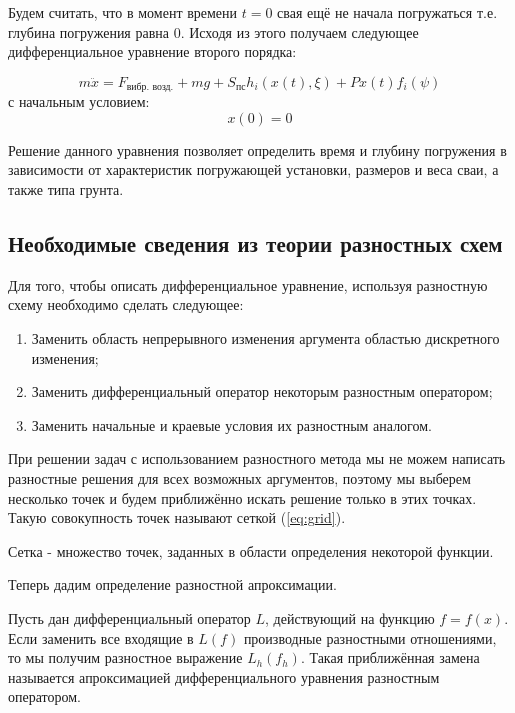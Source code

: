 \noindent Будем считать, что в момент времени $t = 0$ свая ещё не начала погружаться т.е. глубина погружения равна 0.
Исходя из этого получаем следующее дифференциальное уравнение второго порядка:

\begin{equation}
    \label{eq:main}
    m\ddot{x} = F_\text{вибр. возд.} + mg + S_\text{пс} h_i(x(t), \xi) + P x(t) f_i(\psi)
\end{equation}
с начальным условием:
\begin{equation}
    x(0) = 0
\end{equation}

Решение данного уравнения позволяет определить время и глубину погружения в зависимости от характеристик погружающей
установки, размеров и веса сваи, а также типа грунта.

\subsection{Необходимые сведения из теории разностных схем}

Для того, чтобы описать дифференциальное уравнение, используя разностную схему необходимо сделать следующее:
\begin{enumerate}
    \item Заменить область непрерывного изменения аргумента областью дискретного изменения;
    \item Заменить дифференциальный оператор некоторым разностным оператором;
    \item Заменить начальные и краевые условия их разностным аналогом.
\end{enumerate}

При решении задач с использованием разностного метода мы не можем написать разностные решения для всех возможных аргументов,
поэтому мы выберем несколько точек и будем приближённо искать решение только в этих точках. Такую совокупность точек
называют сеткой (\ref{eq:grid}).

\begin{definition}
    \label{eq:grid}
    Сетка - множество точек, заданных в области определения некоторой функции.
\end{definition}

Теперь дадим определение разностной апроксимации.

\begin{definition}
    Пусть дан дифференциальный оператор $L$, действующий на функцию $f = f(x)$. Если заменить все входящие в $L(f)$
    производные разностными отношениями, то мы получим разностное выражение $L_h(f_h)$. Такая приближённая замена называется
    апроксимацией дифференциального уравнения разностным оператором.
\end{definition}

